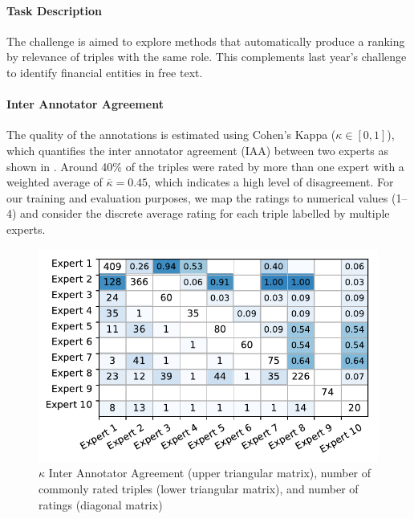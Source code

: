 {\setlength{\parindent}{0cm}
\paragraph{\textbf{Task Description}}
The challenge is aimed to explore methods that automatically produce a ranking by relevance of triples with the same role\cite{feiii_overview}.
This complements last year's challenge to identify financial entities in free text\cite{dsmm16}.
}

{\setlength{\parindent}{0cm}
\paragraph{\textbf{Inter Annotator Agreement}}
The quality of the annotations is estimated using Cohen's Kappa\cite{ir} ($\kappa\in [0,1]$), which quantifies the inter annotator agreement (IAA) between two experts as shown in .
Around 40\% of the triples were rated by more than one expert with a weighted average of $\overline{\kappa}=0.45$, which indicates a high level of disagreement.
For our training and evaluation purposes, we map the ratings to numerical values (1--4) and consider the discrete average rating for each triple labelled by multiple experts.
}
\begin{figure}[b]
	\includegraphics[width=0.8\linewidth]{iaa}
	\caption{$\kappa$ Inter Annotator Agreement (upper triangular matrix), number of commonly rated triples (lower triangular matrix), and number of ratings (diagonal matrix)}
	\label{fig:iaa}
\end{figure}


